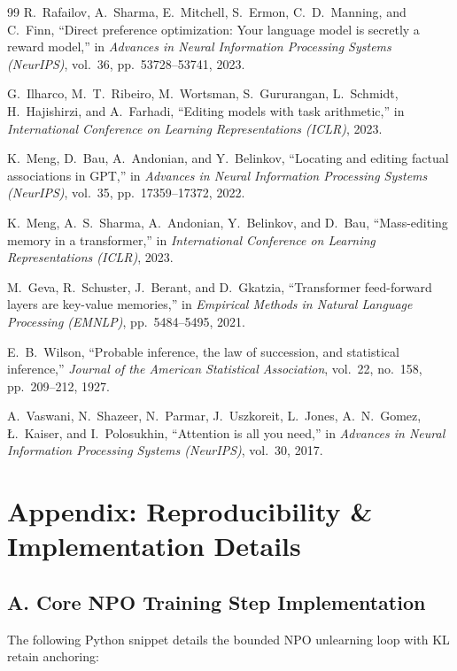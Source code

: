 \documentclass[11pt,a4paper]{article}
\begin{document}
\begin{thebibliography}{99}
R.~Rafailov, A.~Sharma, E.~Mitchell, S.~Ermon, C.~D.~Manning, and C.~Finn,
``Direct preference optimization: Your language model is secretly a reward model,''
in \emph{Advances in Neural Information Processing Systems (NeurIPS)}, vol.~36, pp.~53728--53741, 2023.

G.~Ilharco, M.~T.~Ribeiro, M.~Wortsman, S.~Gururangan, L.~Schmidt, H.~Hajishirzi, and A.~Farhadi,
``Editing models with task arithmetic,''
in \emph{International Conference on Learning Representations (ICLR)}, 2023.

K.~Meng, D.~Bau, A.~Andonian, and Y.~Belinkov,
``Locating and editing factual associations in GPT,''
in \emph{Advances in Neural Information Processing Systems (NeurIPS)}, vol.~35, pp.~17359--17372, 2022.

K.~Meng, A.~S.~Sharma, A.~Andonian, Y.~Belinkov, and D.~Bau,
``Mass-editing memory in a transformer,''
in \emph{International Conference on Learning Representations (ICLR)}, 2023.

M.~Geva, R.~Schuster, J.~Berant, and D.~Gkatzia,
``Transformer feed-forward layers are key-value memories,''
in \emph{Empirical Methods in Natural Language Processing (EMNLP)}, pp.~5484--5495, 2021.

E.~B.~Wilson,
``Probable inference, the law of succession, and statistical inference,''
\emph{Journal of the American Statistical Association}, vol.~22, no.~158, pp.~209--212, 1927.

A.~Vaswani, N.~Shazeer, N.~Parmar, J.~Uszkoreit, L.~Jones, A.~N.~Gomez, {\L}.~Kaiser, and I.~Polosukhin,
``Attention is all you need,''
in \emph{Advances in Neural Information Processing Systems (NeurIPS)}, vol.~30, 2017.

\end{thebibliography}

\newpage
\appendix
\section*{Appendix: Reproducibility \& Implementation Details}

\subsection*{A. Core NPO Training Step Implementation}
The following Python snippet details the bounded NPO unlearning loop with KL retain anchoring:
\end{document}
